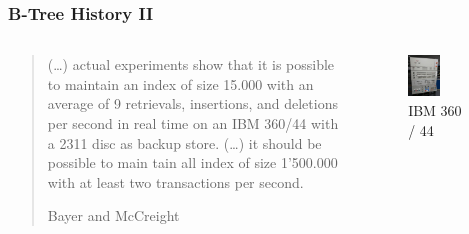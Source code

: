 \documentclass{beamer}
\begin{document}
\begin{frame}
    \frametitle{B-Tree History II}
    \begin{columns}
        \begin{column}{0.5\textwidth}
            \begin{block}{}
                \blockquote[Bayer and McCreight]{(\ldots) actual experiments show that it is possible to maintain an index of size 15.000 with an average of 9 retrievals, insertions, and deletions per second in real time on an IBM 360/44 with a 2311 disc as backup store. (\ldots) it should be possible to main tain all index of size 1'500.000 with at least two transactions per second.}
            \end{block}
        \end{column}
        \begin{column}{0.5\textwidth}
            \begin{block}{}
                \begin{figure}
                    \centering
                    \includegraphics[width=0.5\textwidth,height=\textheight,keepaspectratio]{resources/made/ibm360_44.png}
                    \caption[]{IBM 360 / 44}
                \end{figure}
            \end{block}
        \end{column}
    \end{columns}
\end{frame}
\end{document}
